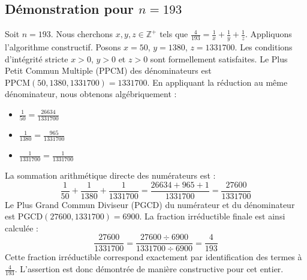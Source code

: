 \documentclass[11pt,a4paper]{article}
\begin{document}
\subsection{Démonstration pour $n = 193$}
Soit $n = 193$. Nous cherchons $x, y, z \in \mathbb{Z}^{+}$ tels que $\frac{4}{193} = \frac{1}{x} + \frac{1}{y} + \frac{1}{z}$.
Appliquons l'algorithme constructif. Posons $x = 50$, $y = 1380$, $z = 1331700$.
Les conditions d'intégrité stricte $x > 0$, $y > 0$ et $z > 0$ sont formellement satisfaites.
Le Plus Petit Commun Multiple (PPCM) des dénominateurs est $\text{PPCM}(50, 1380, 1331700) = 1331700$.
En appliquant la réduction au même dénominateur, nous obtenons algébriquement :
\begin{itemize}
    \item $\frac{1}{50} = \frac{26634}{1331700}$
    \item $\frac{1}{1380} = \frac{965}{1331700}$
    \item $\frac{1}{1331700} = \frac{1}{1331700}$
\end{itemize}
La sommation arithmétique directe des numérateurs est :
$$ \frac{1}{50} + \frac{1}{1380} + \frac{1}{1331700} = \frac{26634 + 965 + 1}{1331700} = \frac{27600}{1331700} $$
Le Plus Grand Commun Diviseur (PGCD) du numérateur et du dénominateur est $\text{PGCD}(27600, 1331700) = 6900$.
La fraction irréductible finale est ainsi calculée :
$$ \frac{27600}{1331700} = \frac{27600 \div 6900}{1331700 \div 6900} = \frac{4}{193} $$
Cette fraction irréductible correspond exactement par identification des termes à $\frac{4}{193}$. L'assertion est donc démontrée de manière constructive pour cet entier.
\end{document}
